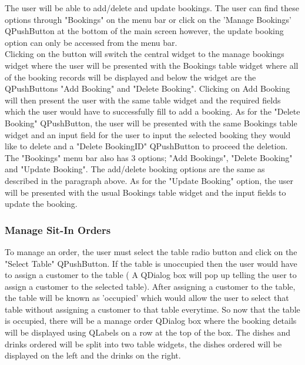 The user will be able to add/delete and update bookings. The user can find these options through "Bookings" on the menu bar or click on the 'Manage Bookings' QPushButton at the bottom of the main screen however, the update booking option can only be accessed from the menu bar.  \\

Clicking on the button will switch the central widget to the manage bookings widget where the user will be presented with the Bookings table widget where all of the booking records will be displayed and below the widget are the QPushButtons "Add Booking" and "Delete Booking". Clicking on Add Booking will then present the user with the same table widget and the required fields which the user would have to successfully fill to add a booking. As for the "Delete Booking"  QPushButton, the user will be presented with the same Bookings table widget and an input field for the user to input the selected booking they would like to delete and a "Delete BookingID" QPushButton to proceed the deletion. \\

The "Bookings" menu bar also has 3 options; "Add Bookings", "Delete Booking" and "Update Booking". The add/delete booking options are the same as described in the paragraph above. As for the "Update Booking" option, the user will be presented with the usual Bookings table widget and the input fields to update the booking.  

\subsubsection{Manage Sit-In Orders}

To manage an order, the user must select the table radio button and click on the "Select Table" QPushButton. If the table is unoccupied then the user would have to assign a customer to the table ( A QDialog box will pop up telling the user to assign a customer to the selected table). After assigning a customer to the table, the table will be known as 'occupied' which would allow the user to select that table without assigning a customer to that table everytime. So now that the table is occupied, there will be a manage order QDialog box where the booking details will be displayed using QLabels on a row at the top of the box. The dishes and drinks ordered will be split into two table widgets, the dishes ordered will be displayed on the left and the drinks on the right. \\

